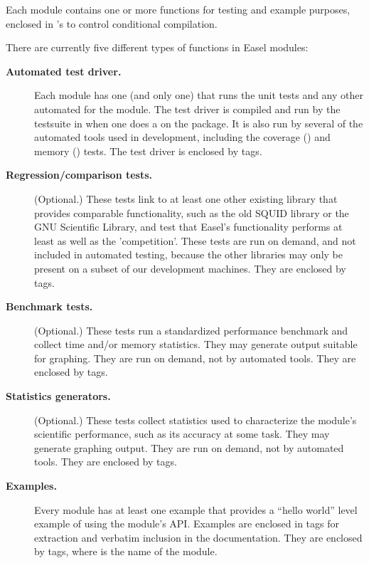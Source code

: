 Each module contains one or more  functions for testing
and example purposes, enclosed in 's to control
conditional compilation.

There are currently five different types of  functions
in Easel modules:

\begin{description} 

\item[\textbf{Automated test driver.}] Each module has one (and only
  one)  that runs the unit tests and any other automated
  for the module. The test driver is compiled and run by the testsuite
  in  when one does a  on the package. It is also run by several of the automated
  tools used in development, including the coverage () and
  memory () tests.  The test driver is enclosed by
   tags.

\item[\textbf{Regression/comparison tests.}] (Optional.) These tests
  link to at least one other existing library that provides comparable
  functionality, such as the old SQUID library or the GNU Scientific
  Library, and test that Easel's functionality performs at least as
  well as the 'competition'. These tests are run on demand, and not
  included in automated testing, because the other libraries may only
  be present on a subset of our development machines. They are
  enclosed by  tags.

\item[\textbf{Benchmark tests.}] (Optional.) These tests run a
  standardized performance benchmark and collect time and/or memory
  statistics. They may generate output suitable for graphing. They are
  run on demand, not by automated tools. They are enclosed by
   tags.

\item[\textbf{Statistics generators.}] (Optional.) These tests collect
  statistics used to characterize the module's scientific performance,
  such as its accuracy at some task. They may generate graphing
  output. They are run on demand, not by automated tools. They are
  enclosed by  tags.

\item[\textbf{Examples.}] Every module has at least one example
   that provides a ``hello world'' level example of
  using the module's API. Examples are enclosed in 
  tags for extraction and verbatim inclusion in the documentation.
  They are enclosed by  tags, where
   is the name of the module.
\end{description}  

